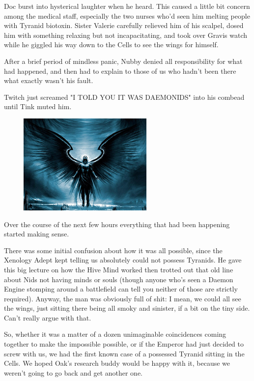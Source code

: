 Doc burst into hysterical laughter when he heard. 
This caused a little bit concern among the medical staff, especially the two nurses who'd seen him melting people with Tyranid biotoxin. 
Sister Valerie carefully relieved him of his scalpel, dosed him with something relaxing but not incapacitating, and took over Gravis watch while he giggled his way down to the Cells to see the wings for himself.

After a brief period of mindless panic, Nubby denied all responsibility for what had happened, and then had to explain to those of us who hadn't been there what exactly wasn't his fault.

Twitch just screamed "I TOLD YOU IT WAS DAEMONIDS" into his combead until Tink muted him.

\begin{figure}
	\begin{center}
		\includegraphics[width=\figwidth]{pics/15/39.png}
	\end{center}
\end{figure}
Over the course of the next few hours everything that had been happening started making sense.

There was some initial confusion about how it was all possible, since the Xenology Adept kept telling us absolutely could not possess Tyranids. 
He gave this big lecture on how the Hive Mind worked then trotted out that old line about Nids not having minds or souls (though anyone who's seen a Daemon Engine stomping around a battlefield can tell you neither of those are strictly required). 
Anyway, the man was obviously full of shit: 
I mean, we could all see the wings, just sitting there being all smoky and sinister, if a bit on the tiny side. 
Can't really argue with that. 


So, whether it was a matter of a dozen unimaginable coincidences coming together to make the impossible possible, or if the Emperor had just decided to screw with us, we had the first known case of a possessed Tyranid sitting in the Cells. 
We hoped Oak's research buddy would be happy with it, because we weren't going to go back and get another one.

